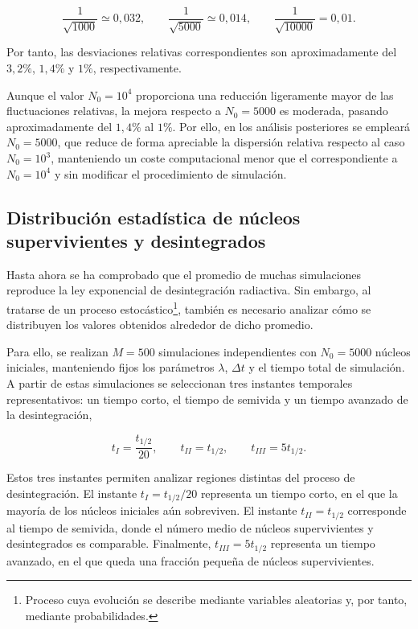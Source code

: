 \documentclass[12pt,a4paper]{article}
\begin{document}
\begin{equation}
\frac{1}{\sqrt{1000}}\simeq 0{,}032,
\qquad
\frac{1}{\sqrt{5000}}\simeq 0{,}014,
\qquad
\frac{1}{\sqrt{10000}}=0{,}01.
\end{equation}

Por tanto, las desviaciones relativas correspondientes son aproximadamente del $3{,}2\%$, $1{,}4\%$ y $1\%$, respectivamente.

Aunque el valor $N_0=10^4$ proporciona una reducción ligeramente mayor de las fluctuaciones relativas, la mejora respecto a $N_0=5000$ es moderada, pasando aproximadamente del $1{,}4\%$ al $1\%$. Por ello, en los análisis posteriores se empleará $N_0=5000$, que reduce de forma apreciable la dispersión relativa respecto al caso $N_0=10^3$, manteniendo un coste computacional menor que el correspondiente a $N_0=10^4$ y sin modificar el procedimiento de simulación.


\subsection{Distribución estadística de núcleos supervivientes y desintegrados}
\label{sec:estudio_regiones_desintegracion}

Hasta ahora se ha comprobado que el promedio de muchas simulaciones reproduce la ley exponencial de desintegración radiactiva. Sin embargo, al tratarse de un proceso estocástico\footnote{Proceso cuya evolución se describe mediante variables aleatorias y, por tanto, mediante probabilidades.}, también es necesario analizar cómo se distribuyen los valores obtenidos alrededor de dicho promedio.

Para ello, se realizan $M=500$ simulaciones independientes con $N_0=5000$ núcleos iniciales, manteniendo fijos los parámetros $\lambda$, $\Delta t$ y el tiempo total de simulación. A partir de estas simulaciones se seleccionan tres instantes temporales representativos: un tiempo corto, el tiempo de semivida y un tiempo avanzado de la desintegración,

\begin{equation}
t_I=\frac{t_{1/2}}{20},
\qquad
t_{II}=t_{1/2},
\qquad
t_{III}=5t_{1/2}.
\label{eq:tiempos_histogramas}
\end{equation}

Estos tres instantes permiten analizar regiones distintas del proceso de desintegración. El instante $t_I=t_{1/2}/20$ representa un tiempo corto, en el que la mayoría de los núcleos iniciales aún sobreviven. El instante $t_{II}=t_{1/2}$ corresponde al tiempo de semivida, donde el número medio de núcleos supervivientes y desintegrados es comparable. Finalmente, $t_{III}=5t_{1/2}$ representa un tiempo avanzado, en el que queda una fracción pequeña de núcleos supervivientes.
\end{document}
